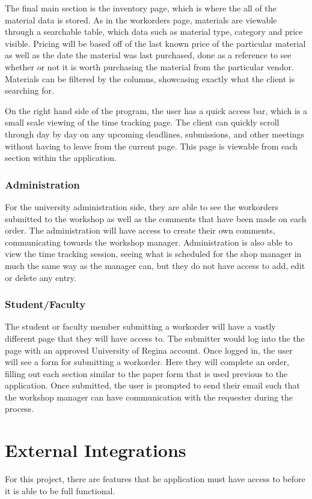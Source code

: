 {{{{{{{{{{The final main section is the inventory page, which is where the all of the material data is stored. As in the workorders page, materials are viewable through a searchable table, which data such as material type, category and price visible. Pricing will be based off of the last known price of the particular material as well as the date the material was last purchased, done as a reference to see whether or not it is worth purchasing the material from the particular vendor. Materials can be filtered by the columns, showcasing exactly what the client is searching for. 
\newline
{\setlength{\parindent}{0cm}

On the right hand side of the program, the user has a quick access bar, which is a small scale viewing of the time tracking page. The client can quickly scroll through day by day on any upcoming deadlines, submissions, and other meetings without having to leave from the current page. This page is viewable from each section within the application. 

\subsubsection{Administration}
For the university administration side, they are able to see the workorders submitted to the workshop as well as the comments that have been made on each order. The administration will have access to create their own comments, communicating towards the workshop manager. Administration is also able to view the time tracking session, seeing what is scheduled for the shop manager in much the same way as the manager can, but they do not have access to add, edit or delete any entry. 

\subsubsection{Student/Faculty}
The student or faculty member submitting a workorder will have a vastly different page that they will have access to. The submitter would log into the the page with an approved University of Regina account. Once logged in, the user will see a form for submitting a workorder. Here they will complete an order, filling out each section similar to the paper form that is used previous to the application. Once submitted, the user is prompted to send their email such that the workshop manager can have communication with the requester during the process. 
 
\section{External Integrations}
For this project, there are features that he application must have access to before it is able to be full functional. 

}}}}}}}}}}}
